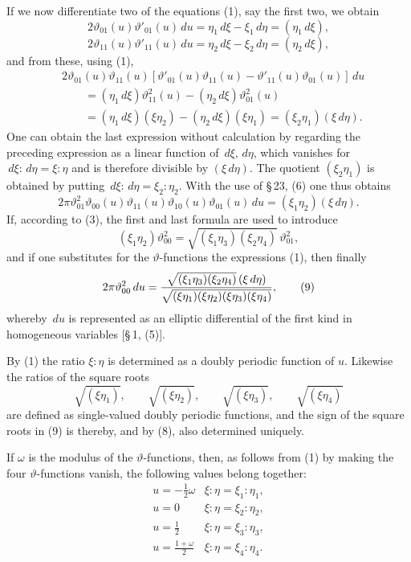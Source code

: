 \documentclass[11pt]{article}
\providecommand{\dd}{\,d}
\providecommand{\tht}{\vartheta}
\begin{document}
If we now differentiate two of the equations (1), say the first two, we obtain
\[
2\tht_{01}(u)\tht'_{01}(u)\dd u=\eta_1\dd\xi-\xi_1\dd\eta=(\eta_1\dd\xi),
\]
\[
2\tht_{11}(u)\tht'_{11}(u)\dd u=\eta_2\dd\xi-\xi_2\dd\eta=(\eta_2\dd\xi),
\]
and from these, using (1),
\begin{align*}
&2\tht_{01}(u)\tht_{11}(u)
\left[\tht'_{01}(u)\tht_{11}(u)-\tht'_{11}(u)\tht_{01}(u)\right]\dd u\\
&\qquad=(\eta_1\dd\xi)\tht_{11}^{2}(u)-(\eta_2\dd\xi)\tht_{01}^{2}(u)\\
&\qquad=(\eta_1\dd\xi)(\xi\eta_2)-(\eta_2\dd\xi)(\xi\eta_1)=(\xi_2\eta_1)(\xi\dd\eta).
\end{align*}
One can obtain the last expression without calculation by regarding the preceding expression as a linear function of $\dd\xi,\dd\eta$, which vanishes for $\dd\xi:\dd\eta=\xi:\eta$ and is therefore divisible by $(\xi\dd\eta)$. The quotient $(\xi_2\eta_1)$ is obtained by putting $\dd\xi:\dd\eta=\xi_2:\eta_2$. With the use of \S\,23, (6) one thus obtains
\begin{equation}
2\pi\tht_{01}^{2}\tht_{00}(u)\tht_{11}(u)\tht_{10}(u)\tht_{01}(u)\dd u=(\xi_1\eta_2)(\xi\dd\eta).
\tag{7}
\end{equation}
If, according to (3), the first and last formula are used to introduce
\begin{equation}
(\xi_1\eta_2)\tht_{00}^{2}=\sqrt{(\xi_1\eta_3)(\xi_2\eta_4)}\,\tht_{01}^{2},
\tag{8}
\end{equation}
and if one substitutes for the $\vartheta$-functions the expressions (1), then finally
\begin{equation}
2\pi\tht_{00}^{2}\dd u=
{\sqrt{(\xi_1\eta_3)(\xi_2\eta_4)}\,(\xi\dd\eta)
\over
\sqrt{(\xi\eta_1)(\xi\eta_2)(\xi\eta_3)(\xi\eta_4)}} ,
\tag{9}
\end{equation}
whereby $\dd u$ is represented as an elliptic differential of the first kind in homogeneous variables [\S\,1, (5)].

By (1) the ratio $\xi:\eta$ is determined as a doubly periodic function of $u$. Likewise the ratios of the square roots
\begin{equation}
\sqrt{(\xi\eta_1)},\qquad \sqrt{(\xi\eta_2)},\qquad
\sqrt{(\xi\eta_3)},\qquad \sqrt{(\xi\eta_4)}
\tag{10}
\end{equation}
are defined as single-valued doubly periodic functions, and the sign of the square roots in (9) is thereby, and by (8), also determined uniquely.

If $\omega$ is the modulus of the $\vartheta$-functions, then, as follows from (1) by making the four $\vartheta$-functions vanish, the following values belong together:
\begin{equation}
\begin{array}{c|c}
 u=-\frac12\omega & \xi:\eta=\xi_1:\eta_1,\\[0.35em]
 u=0 & \xi:\eta=\xi_2:\eta_2,\\[0.35em]
 u=\frac12 & \xi:\eta=\xi_3:\eta_3,\\[0.35em]
 u=\frac{1+\omega}{2} & \xi:\eta=\xi_4:\eta_4.
\end{array}
\tag{11}
\end{equation}
\end{document}
